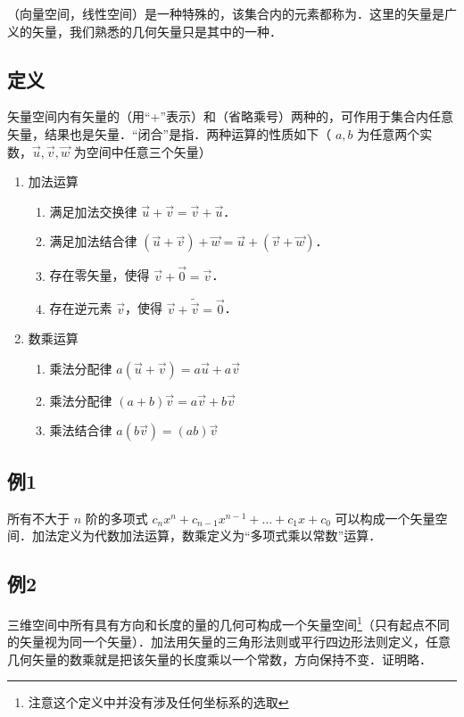 
（向量空间，线性空间）是一种特殊的，该集合内的元素都称为．这里的矢量是广义的矢量，我们熟悉的几何矢量只是其中的一种．

\subsection{定义}
矢量空间内有矢量的（用“+”表示）和（省略乘号）两种的，可作用于集合内任意矢量，结果也是矢量．“闭合”是指．两种运算的性质如下（ $a,b$ 为任意两个实数，$\vec u,\vec v,\vec w$ 为空间中任意三个矢量）
\begin{enumerate}
\item 加法运算
\begin{enumerate}
\item 满足加法交换律 $\vec u + \vec v = \vec v + \vec u$．
\item 满足加法结合律 $(\vec u + \vec v) + \vec w = \vec u + (\vec v + \vec w)$．
\item 存在零矢量，使得 $\vec v + \vec 0 = \vec v$．
\item 存在逆元素 $\vec v$，使得 $\vec v + \tilde{\vec v} = \vec 0$．
\end{enumerate}

\item 数乘运算
\begin{enumerate}
\item 乘法分配律 $a(\vec u + \vec v) = a\vec u + a\vec v$ 
\item 乘法分配律 $(a + b)\vec v = a\vec v + b\vec v$
\item 乘法结合律 $a (b \vec v) = (ab) \vec v$
\end{enumerate}
\end{enumerate}

\subsection{例1}
所有不大于 $n$ 阶的多项式 $c_n x^n + c_{n-1} x^{n-1} + \dots + c_1 x + c_0$ 可以构成一个矢量空间．加法定义为代数加法运算，数乘定义为“多项式乘以常数”运算． 

\subsection{例2}
三维空间中所有具有方向和长度的量的几何可构成一个矢量空间\footnote{注意这个定义中并没有涉及任何坐标系的选取}（只有起点不同的矢量视为同一个矢量）．加法用矢量的三角形法则或平行四边形法则定义，任意几何矢量的数乘就是把该矢量的长度乘以一个常数，方向保持不变．证明略．

